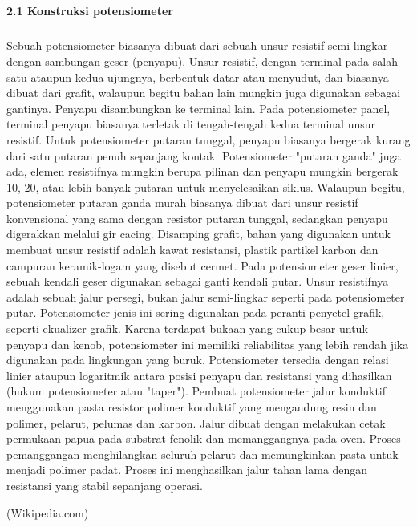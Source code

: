 \documentclass[12pt,a4paper]{article}
\begin{document}
\subparagraph{ }
\textbf{2.1 Konstruksi potensiometer}
\subparagraph{ }
	Sebuah potensiometer biasanya dibuat dari sebuah unsur resistif semi-lingkar dengan sambungan geser (penyapu). Unsur resistif, dengan terminal pada salah satu ataupun kedua ujungnya, berbentuk datar atau menyudut, dan biasanya dibuat dari grafit, walaupun begitu bahan lain mungkin juga digunakan sebagai gantinya. Penyapu disambungkan ke terminal lain. Pada potensiometer panel, terminal penyapu biasanya terletak di tengah-tengah kedua terminal unsur resistif. Untuk potensiometer putaran tunggal, penyapu biasanya bergerak kurang dari satu putaran penuh sepanjang kontak. Potensiometer "putaran ganda" juga ada, elemen resistifnya mungkin berupa pilinan dan penyapu mungkin bergerak 10, 20, atau lebih banyak putaran untuk menyelesaikan siklus. Walaupun begitu, potensiometer putaran ganda murah biasanya dibuat dari unsur resistif konvensional yang sama dengan resistor putaran tunggal, sedangkan penyapu digerakkan melalui gir cacing. Disamping grafit, bahan yang digunakan untuk membuat unsur resistif adalah kawat resistansi, plastik partikel karbon dan campuran keramik-logam yang disebut cermet. Pada potensiometer geser linier, sebuah kendali geser digunakan sebagai ganti kendali putar. Unsur resistifnya adalah sebuah jalur persegi, bukan jalur semi-lingkar seperti pada potensiometer putar. Potensiometer jenis ini sering digunakan pada peranti penyetel grafik, seperti ekualizer grafik. Karena terdapat bukaan yang cukup besar untuk penyapu dan kenob, potensiometer ini memiliki reliabilitas yang lebih rendah jika digunakan pada lingkungan yang buruk.
	Potensiometer tersedia dengan relasi linier ataupun logaritmik antara posisi penyapu dan resistansi yang dihasilkan (hukum potensiometer atau "taper").
	Pembuat potensiometer jalur konduktif menggunakan pasta resistor polimer konduktif yang mengandung resin dan polimer, pelarut, pelumas dan karbon. Jalur dibuat dengan melakukan cetak permukaan papua pada substrat fenolik dan memanggangnya pada oven. Proses pemanggangan menghilangkan seluruh pelarut dan memungkinkan pasta untuk menjadi polimer padat. Proses ini menghasilkan jalur tahan lama dengan resistansi yang stabil sepanjang operasi.
	
\begin{flushright}
(Wikipedia.com) 
\end{flushright}
\end{document}
